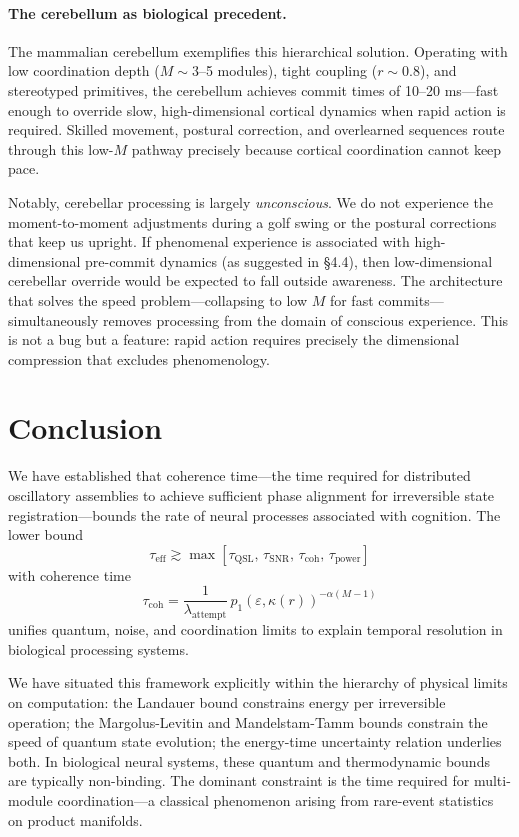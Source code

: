 \documentclass[12pt]{article}
\begin{document}
\paragraph{The cerebellum as biological precedent.} The mammalian cerebellum exemplifies this hierarchical solution. Operating with low coordination depth ($M \sim 3$--5 modules), tight coupling ($r \sim 0.8$), and stereotyped primitives, the cerebellum achieves commit times of 10--20 ms---fast enough to override slow, high-dimensional cortical dynamics when rapid action is required. Skilled movement, postural correction, and overlearned sequences route through this low-$M$ pathway precisely because cortical coordination cannot keep pace.

Notably, cerebellar processing is largely \emph{unconscious}. We do not experience the moment-to-moment adjustments during a golf swing or the postural corrections that keep us upright. If phenomenal experience is associated with high-dimensional pre-commit dynamics (as suggested in \S4.4), then low-dimensional cerebellar override would be expected to fall outside awareness. The architecture that solves the speed problem---collapsing to low $M$ for fast commits---simultaneously removes processing from the domain of conscious experience. This is not a bug but a feature: rapid action requires precisely the dimensional compression that excludes phenomenology.

\section{Conclusion}

We have established that coherence time---the time required for distributed oscillatory assemblies to achieve sufficient phase alignment for irreversible state registration---bounds the rate of neural processes associated with cognition. The lower bound
\[
\tau_{\mathrm{eff}} \gtrsim \max\left[\tau_{\mathrm{QSL}},\, \tau_{\mathrm{SNR}},\, \tau_{\mathrm{coh}},\, \tau_{\mathrm{power}}\right]
\]
with coherence time
\[
\tau_{\mathrm{coh}} = \frac{1}{\lambda_{\mathrm{attempt}}}\,p_1(\varepsilon, \kappa(r))^{-\alpha(M-1)}
\]
unifies quantum, noise, and coordination limits to explain temporal resolution in biological processing systems.

We have situated this framework explicitly within the hierarchy of physical limits on computation: the Landauer bound constrains energy per irreversible operation; the Margolus-Levitin and Mandelstam-Tamm bounds constrain the speed of quantum state evolution; the energy-time uncertainty relation underlies both. In biological neural systems, these quantum and thermodynamic bounds are typically non-binding. The dominant constraint is the time required for multi-module coordination---a classical phenomenon arising from rare-event statistics on product manifolds.
\end{document}
